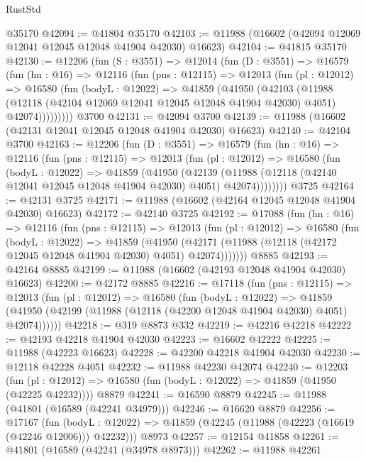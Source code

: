 \begin{lexlean}{RustStd}
\begin{coremodule}
    @35170
@42094 := @41804 @35170
@42103 := @11988 (@16602 (@42094 @12069 @12041 @12045 @12048 @41904 @42030) @16623)
@42104 := @41815 @35170
@42130 := @12206
    (fun (S : @3551) =>
    @12014
      (fun (D : @3551) =>
      @16579
        (fun (hn : @16) =>
        @12116
          (fun (pns : @12115) =>
          @12013
            (fun (pl : @12012) =>
            @16580
              (fun (bodyL : @12022) =>
              @41859
                (@41950
                  (@42103
                    (@11988
                      (@12118 (@42104 @12069 @12041 @12045 @12048 @41904 @42030) @4051)
                      @42074)))))))))
    @3700
@42131 := @42094 @3700
@42139 := @11988 (@16602 (@42131 @12041 @12045 @12048 @41904 @42030) @16623)
@42140 := @42104 @3700
@42163 := @12206
    (fun (D : @3551) =>
    @16579
      (fun (hn : @16) =>
      @12116
        (fun (pns : @12115) =>
        @12013
          (fun (pl : @12012) =>
          @16580
            (fun (bodyL : @12022) =>
            @41859
              (@41950
                (@42139
                  (@11988 (@12118 (@42140 @12041 @12045 @12048 @41904 @42030) @4051) @42074))))))))
    @3725
@42164 := @42131 @3725
@42171 := @11988 (@16602 (@42164 @12045 @12048 @41904 @42030) @16623)
@42172 := @42140 @3725
@42192 := @17088
    (fun (hn : @16) =>
    @12116
      (fun (pns : @12115) =>
      @12013
        (fun (pl : @12012) =>
        @16580
          (fun (bodyL : @12022) =>
          @41859
            (@41950
              (@42171 (@11988 (@12118 (@42172 @12045 @12048 @41904 @42030) @4051) @42074)))))))
    @8885
@42193 := @42164 @8885
@42199 := @11988 (@16602 (@42193 @12048 @41904 @42030) @16623)
@42200 := @42172 @8885
@42216 := @17118
    (fun (pns : @12115) =>
    @12013
      (fun (pl : @12012) =>
      @16580
        (fun (bodyL : @12022) =>
        @41859 (@41950 (@42199 (@11988 (@12118 (@42200 @12048 @41904 @42030) @4051) @42074))))))
@42218 := @319 @8873 @332
@42219 := @42216 @42218
@42222 := @42193 @42218 @41904 @42030
@42223 := @16602 @42222
@42225 := @11988 (@42223 @16623)
@42228 := @42200 @42218 @41904 @42030
@42230 := @12118 @42228 @4051
@42232 := @11988 @42230 @42074
@42240 := @12203
    (fun (pl : @12012) => @16580 (fun (bodyL : @12022) => @41859 (@41950 (@42225 @42232))))
    @8879
@42241 := @16590 @8879
@42245 := @11988 (@41801 (@16589 (@42241 @34979)))
@42246 := @16620 @8879
@42256 := @17167
    (fun (bodyL : @12022) => @41859 (@42245 (@11988 (@42223 (@16619 (@42246 @12006))) @42232)))
    @8973
@42257 := @12154 @41858
@42261 := @41801 (@16589 (@42241 (@34978 @8973)))
@42262 := @11988 @42261

\end{coremodule}
\end{lexlean}
